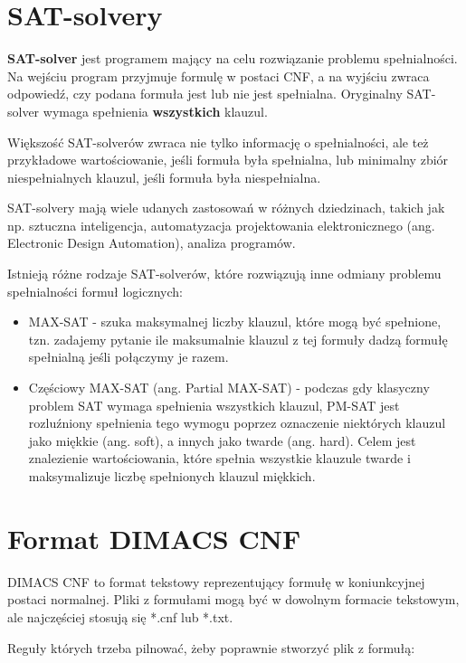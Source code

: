 \documentclass[a4paper,12pt,oneside]{book}
\theoremstyle{definition}
\begin{document}
\section{SAT-solvery}

\textbf{SAT-solver} jest programem mający na celu rozwiązanie problemu spełnialności. Na wejściu program przyjmuje formulę w postaci CNF, a na wyjściu zwraca odpowiedź, czy podana formuła jest lub nie jest spełnialna. Oryginalny SAT-solver wymaga spełnienia \textbf{wszystkich} klauzul.

Większość SAT-solverów zwraca nie tylko informację o spełnialności, ale też przykładowe wartościowanie, jeśli formuła była spełnialna, lub minimalny zbiór niespełnialnych klauzul, jeśli formuła była niespełnialna.

SAT-solvery mają wiele udanych zastosowań w różnych dziedzinach, takich jak np. sztuczna inteligencja, automatyzacja projektowania elektronicznego (ang. Electronic Design Automation), analiza programów.

Istnieją różne rodzaje SAT-solverów, które rozwiązują inne odmiany problemu spełnialności formuł logicznych: 

\begin{itemize}
    \item MAX-SAT - szuka maksymalnej liczby klauzul, które mogą być spełnione, tzn. zadajemy pytanie ile maksumalnie klauzul z tej formuły dadzą formułę spełnialną jeśli połączymy je razem.
    \item Częściowy MAX-SAT (ang. Partial MAX-SAT) - podczas gdy klasyczny problem SAT wymaga spełnienia wszystkich klauzul, PM-SAT jest rozluźniony spełnienia tego wymogu poprzez oznaczenie niektórych klauzul jako miękkie (ang. soft), a innych jako twarde (ang. hard). Celem jest znalezienie wartościowania, które spełnia wszystkie klauzule twarde i maksymalizuje liczbę spełnionych klauzul miękkich.

\end{itemize}

\section{Format DIMACS CNF}

DIMACS CNF to format tekstowy reprezentujący formułę w koniunkcyjnej postaci normalnej. Pliki z formułami mogą być w dowolnym formacie tekstowym, ale najczęściej stosują się *.cnf lub *.txt. 

Reguły których trzeba pilnować, żeby poprawnie stworzyć plik z formułą: 
\end{document}
